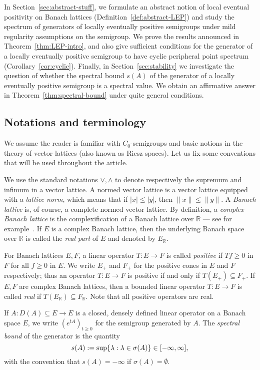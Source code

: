 \documentclass[a4paper, reqno]{amsart}
\numberwithin{equation}{section}
\theoremstyle{plain}
\theoremstyle{definition}
\theoremstyle{remark}
\let\Re\relax
\DeclareMathOperator{\Re}{Re}
\newcommand{\RR}{\mathbb{R}}
\begin{document}
In Section~\ref{sec:abstract-stuff}, we formulate an abstract notion of local eventual positivity on Banach lattices (Definition~\ref{def:abstract-LEP}) and study the spectrum of generators of locally eventually positive semigroups under mild regularity assumptions on the semigroup. We prove the results announced in Theorem~\ref{thm:LEP-intro}, and also give sufficient conditions for the generator of a locally eventually positive semigroup to have cyclic peripheral point spectrum (Corollary~\ref{cor:cyclic}). Finally, in Section~\ref{sec:stability} we investigate the question of whether the spectral bound $s(A)$ of the generator of a locally eventually positive semigroup is a spectral value. We obtain an affirmative answer in Theorem~\ref{thm:spectral-bound} under quite general conditions.

\subsection*{Notations and terminology}
We assume the reader is familiar with $C_0$-semigroups and basic notions in the theory of vector lattices (also known as Riesz spaces). Let us fix some conventions that will be used throughout the article.

We use the standard notations $\vee, \wedge$ to denote respectively the supremum and infimum in a vector lattice. A normed vector lattice is a vector lattice equipped with a \emph{lattice norm}, which means that if $|x|\le |y|$, then $\|x\|\le \|y\|$. A \emph{Banach lattice} is, of course, a complete normed vector lattice. By definition, a \emph{complex Banach lattice} is the complexification of a Banach lattice over $\RR$ --- see for example~\cite[II Section 11]{Sch}. If $E$ is a complex Banach lattice, then the underlying Banach space over $\RR$ is called the \emph{real part} of $E$ and denoted by $E_\RR$.

For Banach lattices $E, F$, a linear operator $T:E\to F$ is called \emph{positive} if $Tf\ge 0$ in $F$ for all $f\ge 0$ in $E$. We write $E_+$ and $F_+$ for the positive cones in $E$ and $F$ respectively; thus an operator $T:E\to F$ is positive if and only if $T(E_+)\subseteq F_+$. If $E, F$ are complex Banach lattices, then a bounded linear operator $T:E\to F$ is called \emph{real} if $T(E_\RR) \subseteq F_\RR$. Note that all positive operators are real.

If $A:D(A)\subseteq E\to E$ is a closed, densely defined linear operator on a Banach space $E$, we write $(e^{tA})_{t\ge 0}$ for the semigroup generated by $A$. The \emph{spectral bound} of the generator is the quantity
\begin{equation*}
	s(A) := \sup\{\Re\lambda : \lambda\in\sigma(A)\} \in [-\infty,\infty],
\end{equation*}
with the convention that $s(A)=-\infty$ if $\sigma(A)=\emptyset$.
\end{document}
